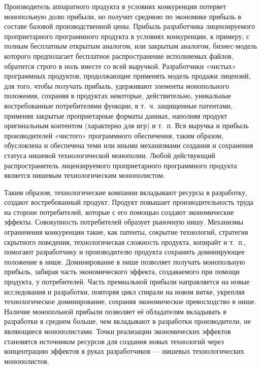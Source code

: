 \documentclass{article}
\begin{document}
Производитель аппаратного продукта в условиях конкуренции потеряет монопольную долю прибыли, но получит среднюю по экономике прибыль в составе базовой производственной цены. Прибыль разработчика лицензируемого проприетарного программного продукта в условиях конкуренции, к примеру, с полным бесплатным открытым аналогом, или закрытым аналогом, бизнес-модель которого предполагает бесплатное распространение исполняемых файлов, обратится строго в ноль вместе со всей выручкой. Разработчики «чистых» программных продуктов, продолжающие применять модель продажи лицензий, для того, чтобы получать прибыль, удерживают элементы монопольного положения, сохраняя в продуктах некоторые, действительно, уникальные востребованные потребителями функции, в т.~ч. защищенные патентами, применяя закрытые проприетарные форматы данных, наполняя продукт оригинальным контентом (характерно для игр) и т.~п. Вся выручка и прибыль производителей «чистого» программного обеспечения, таким образом, обусловлена и обеспечена теми или иными механизмами создания и сохранения статуса нишевой технологической монополии. Любой действующий распространитель лицензируемого проприетарного программного продукта является нишевым технологическим монополистом.

Таким образом, технологические компании вкладывают ресурсы в разработку, создают востребованный продукт. Продукт повышает производительность труда на стороне потребителей, которые с его помощью создают экономические эффекты. Совокупность потребителей образует рыночную нишу. Механизмы ограничения конкуренции такие, как патенты, сокрытие технологий, стратегия скрытного поведения, технологическая сложность продукта, копирайт и т.~п., помогают разработчику и производителю продукта сохранить доминирующее положение в нише. Доминирование в нише позволяет получать монопольную прибыль, забирая часть экономического эффекта, создаваемого при помощи продукта, у потребителей. Часть премиальной прибыли направляется на новые исследования и разработки, повторяя цикл спирали на новом витке, укрепляя технологическое доминирование, сохраняя экономическое превосходство в нише. Наличие монопольной прибыли позволяет её обладателям вкладывать в разработки в среднем больше, чем вкладывают в разработки производители, не являющиеся монополистами. Точки реализации экономических эффектов становятся источником ресурсов для создания новых технологий через концентрацию эффектов в руках разработчиков — нишевых технологических монополистов.
\end{document}

